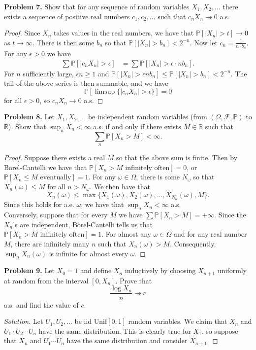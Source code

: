 \documentclass[11pt,letterpaper]{report}
\newcommand{\reals}{\mathbb{R}}
\newcommand{\mcal}[1]{\mathcal{#1}}
\newcommand{\Prob}{\mathbb{P}}
\newenvironment{solution}
{\begin{proof}[Solution]}
{\end{proof}}
\begin{document}
\noindent\textbf{Problem 7. }
Show that for any sequence of random variables $X_1, X_2, \ldots$ there exists a sequence of positive real numbers $c_1, c_2, \ldots$ such that $c_nX_n\to 0$ a.s.
\begin{proof}
	Since $X_n$ takes values in the real numbers, we have that $\Prob[|X_n|>t] \to 0$ as $t\to \infty$. There is then some $b_n$ so that $\Prob[|X_n|>b_n]<2^{-n}$. Now let $c_n = \frac{1}{n\cdot b_n}$. For any $\epsilon>0$ we have
	\begin{align*}
		\sum \Prob[|c_nX_n|>\epsilon] & = \sum \Prob[|X_n| > \epsilon \cdot nb_n].
	\end{align*}
	For $n$ sufficiently large, $\epsilon n \geq 1$ and $\Prob[|X_n| >\epsilon n b_n] \leq \Prob[|X_n| > b_n] < 2^{-n}$. The tail of the above series is then summable, and we have
	\[
	\Prob[\limsup \{|c_n X_n| > \epsilon\}] = 0
	\]
	for all $\epsilon>0$, so $c_nX_n\to 0$ a.s.
\end{proof}

\noindent\textbf{Problem 8. }
Let $X_1, X_2, \ldots$ be independent random variables (from $(\Omega, \mcal{F}, \Prob)$ to $\reals$). Show that $\sup_n X_n<\infty$ a.s. if and only if there exists $M\in \reals$ such that
\[
\sum_n \Prob[X_n>M]<\infty.
\]
\begin{proof}
	Suppose there exists a real $M$ so that the above sum is finite. Then by Borel-Cantelli we have that $\Prob[X_n >M \text{ infinitely often}] = 0$, or $\Prob[X_n \leq M \text{ eventually}] = 1$. For any $\omega\in \Omega$, there is some $N_\omega$ so that $X_n(\omega)\leq M$ for all $n > N_\omega$. We then have that
	\[
	X_n(\omega) \leq \max\{X_1(\omega), X_2(\omega), \ldots, X_{N_\omega}(\omega), M \}.
	\]
	Since this holds for a.e. $\omega$, we have that $\sup_n X_n<\infty$ a.s.\\

	\noindent Conversely, suppose that for every $M$ we have $\sum \Prob[X_n>M] = +\infty$. Since the $X_n$'s are independent, Borel-Cantelli tells us that $\Prob[X_n >M\text{ infinitely often}] = 1$. For almost any $\omega\in \Omega$ and for any real number $M$, there are infinitely many $n$ such that $X_n(\omega)>M$. Consequently, $\sup_n X_n(\omega)$ is infinite for almost every $\omega$.
\end{proof}

\noindent\textbf{Problem 9. }
Let $X_0 = 1$ and define $X_n$ inductively by choosing $X_{n+1}$ uniformly at random from the interval $[0, X_n]$. Prove that
\[
\frac{\log X_n}{n}\to c
\]
a.s. and find the value of $c$.
\begin{solution}
	Let $U_1, U_2, \ldots$ be iid Unif$[0,1]$ random variables. We claim that $X_n$ and $U_1\cdot U_2\cdots U_n$ have the same distribution. This is clearly true for $X_1$, so suppose that $X_n$ and $U_1 \cdots U_n$ have the same distribution and consider $X_{n+1}$. 
\end{solution}
\end{document}
